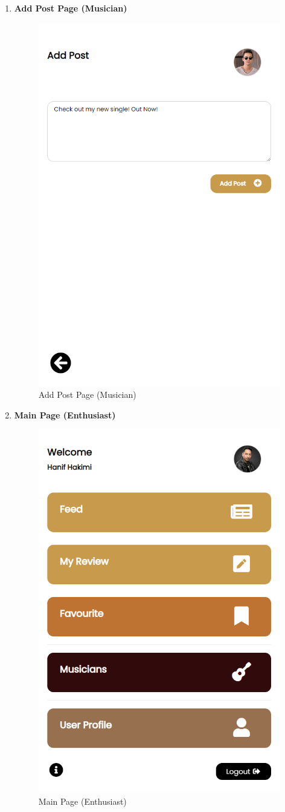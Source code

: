 \begin{enumerate}[1.]
    \item \textbf{Add Post Page (Musician)}
    \begin{figure}[h]
        \centering
        \includegraphics[width=0.5\linewidth]{mainmatter/images/frontend/ss/Add Post (Musician).png}
        \caption{Add Post Page (Musician)}
        \label{fig:myfig61}
    \end{figure}

    \item \textbf{Main Page (Enthusiast)}
    \begin{figure}[h]
        \centering
        \includegraphics[width=0.5\linewidth]{mainmatter/images/frontend/ss/Main Page (Enthusiast).png}
        \caption{Main Page (Enthusiast)}
        \label{fig:myfig62}
    \end{figure}
    

\end{enumerate}
